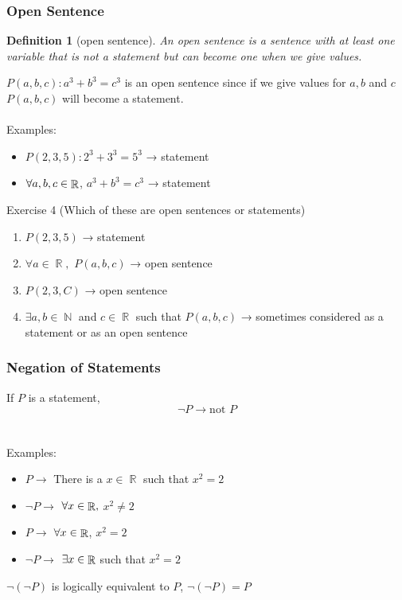 \documentclass[10pt]{article}
\DeclareMathOperator{\N}{{\mathbb{N}}}
\DeclareMathOperator{\R}{{\mathbb{R}}}
\theoremstyle{break}
\newtheorem{defn}{Definition}[subsection]
\begin{document}
\subsubsection{Open Sentence}
\begin{defn}[open sentence]
    An open sentence is a sentence with at least one variable that is not a statement but can become one when we give values.
\end{defn}
$P(a, b, c): a^3 + b^3 = c^3$ is an open sentence since if we give values for $a, b $ and $c$ $P(a,b , c) $ will become a statement. 
\\ \vspace{1ex} \\
Examples:
\begin{itemize}
    \item $P(2, 3 ,5): 2^3 + 3^3 = 5^3$ → statement
    \item $\forall \space a, b, c \in \R$,  $a^3 + b^3 = c^3$  → statement
\end{itemize} 
Exercise 4 (Which of these are open sentences or statements)
\begin{enumerate}
    \item $P(2, 3, 5)$ → statement
    \item $\forall a \in \R,$   $P(a, b , c)$ → open sentence
    \item $P(2, 3, C)$ → open sentence
    \item $\exists a, b \in \N$ and $c \in \R$ such that $P(a, b, c)$ → sometimes considered as a statement or as an open sentence
\end{enumerate}
\subsubsection{Negation of Statements}
If $P$ is a statement, $$\neg P \to \text{not }P$$
\\ \; \\
Examples:
\begin{itemize}
    \item $P \to$  There is a $x \in \R$ such that $x^2 = 2$
    \item $\neg P \to$  $\forall \space x \in \R,$   $x^2 \ne 2$
    \item $P \to$  $\forall \space x \in \R$,   $x^2 = 2$
    \item $\neg P \to$  $\exists \space x \in \R$ such that $x^2 = 2$
\end{itemize}
$\neg (\neg P)$ is logically equivalent to $P$, $\neg (\neg P) = P$
\end{document}
